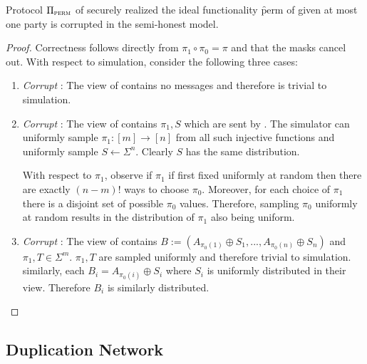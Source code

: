 \begin{theorem}
	Protocol $\Pi_{\textsc{perm}}$ of  securely realized the ideal functionality \f{perm} of  given at most one party is corrupted in the semi-honest model.
\end{theorem}
\begin{proof}
	Correctness follows directly from $\pi_1\circ \pi_0 = \pi$ and that the masks cancel out.
	With respect to simulation, consider the following three cases:
	\begin{enumerate}
		\item \emph{Corrupt \programmer}: The view of \programmer contains no messages and therefore is trivial to simulation. 
		\item \emph{Corrupt \sender}:  The view of \programmer contains $\pi_1, S$ which are sent by \programmer. The simulator can uniformly sample $\pi_1:[m]\rightarrow[n]$ from all such injective functions and uniformly sample $S\gets\Sigma^n$. Clearly $S$ has the same distribution.
		
		With respect to $\pi_1$, observe if $\pi_1$ if first fixed uniformly at random then there are exactly $(n-m)!$ ways to choose $\pi_0$. Moreover, for each choice of $\pi_1$ there is a disjoint set of possible $\pi_0$ values. Therefore, \programmer sampling $\pi_0$ uniformly at random results in the distribution of $\pi_1$ also being uniform.
		
		\item \emph{Corrupt \receiver}: The view of \receiver contains $B:= ( A_{\pi_0(1)} \oplus S_1, ..., A_{\pi_0(n)} \oplus S_n)$  and $\pi_1, T\in \Sigma^m$. $\pi_1,T$ are sampled uniformly and therefore trivial to simulation. similarly, each $B_i=A_{\pi_0(i)}\oplus S_i$ where $S_i$ is uniformly distributed in their view. Therefore $B_i$ is similarly distributed. 
	\end{enumerate}
\end{proof}


\subsection{Duplication Network}\label{sec:dup-proof}


